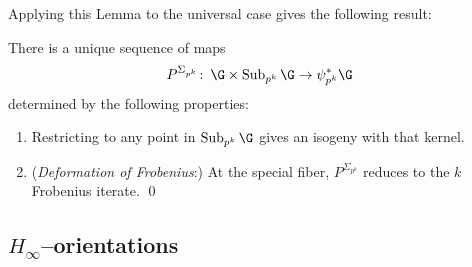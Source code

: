 Applying this Lemma to the universal case gives the following result:

\begin{corollary}\label{DeterminationOfPowerMaps}
There is a unique sequence of maps \[P^{\Sigma_{p^k}}\co \G \times \Sub_{p^k} \G \to \psi_{p^k}^* \G\] determined by the following properties:
\begin{enumerate}
    \item Restricting to any point in \(\Sub_{p^k} \G\) gives an isogeny with that kernel.
    \item (\textit{Deformation of Frobenius}:) At the special fiber, \(P^{\Sigma_{p^k}}\) reduces to the \(k\){\th} Frobenius iterate.
    \qed
\end{enumerate}
\end{corollary}











\subsection*{\(H_\infty\)--orientations}

